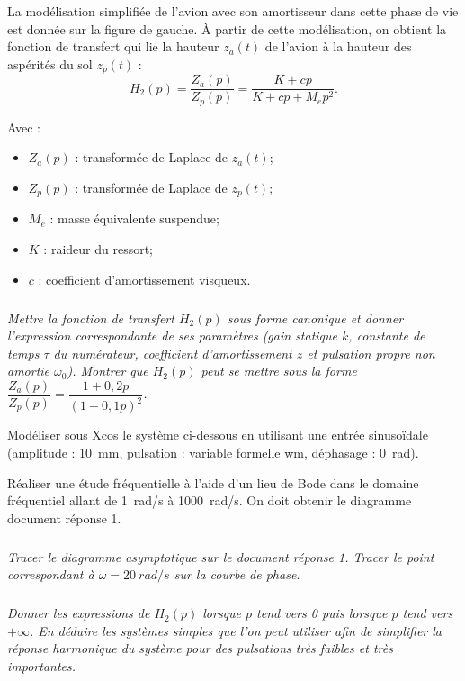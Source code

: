 \documentclass[10pt,fleqn]{article} %
\begin{document}
\begin{multicols}{2}
La modélisation simplifiée de l'avion avec son
amortisseur dans cette phase de vie est
donnée sur la figure de gauche. À partir de
cette modélisation, on obtient la fonction de
transfert qui lie la hauteur $z_a(t)$ de l'avion à la
hauteur des aspérités du sol $z_p(t)$ :
$$
H_2(p)=\dfrac{Z_a(p)}{Z_p(p)}=\dfrac{K+cp}{K+cp+M_e p^2}.
$$

Avec :
\begin{itemize}
\item $Z_a(p)$ : transformée de Laplace de $z_a(t)$;
\item $Z_p(p)$ : transformée de Laplace de $z_p(t)$;
\item $M_e$ : masse équivalente suspendue;
\item $K$ : raideur du ressort;
\item $c$ : coefficient d’amortissement visqueux.
\end{itemize}



\subparagraph{}
\textit{Mettre la fonction de transfert $H_2(p)$ sous forme canonique et donner l’expression correspondante de ses paramètres (gain statique $k$, constante de temps $\tau$ du numérateur, coefficient d’amortissement $z$ et pulsation
propre non amortie $\omega_0$). Montrer que $H_2(p)$ peut se mettre sous la forme $\dfrac{Z_a(p)}{Z_p(p)}=\dfrac{1+0,2p}{\left(1+0,1p\right)^2}$.}
\ifprof
\begin{corrige}
\end{corrige}
\else
\fi

Modéliser sous Xcos le système ci-dessous en
utilisant une entrée sinusoïdale (amplitude : \SI{10}{mm}, pulsation : variable formelle wm,
déphasage : \SI{0}{rad}).

Réaliser une étude fréquentielle à l’aide d’un lieu de Bode dans le domaine fréquentiel allant de \SI{1}{rad/s} à \SI{1000}{rad/s}. On doit obtenir le diagramme document réponse 1.

\subparagraph{}
\textit{Tracer le diagramme asymptotique sur le document réponse 1. Tracer le point correspondant à $\omega=\SI{20}{rad/s}$ sur la courbe de phase.}
\ifprof
\begin{corrige}
\end{corrige}
\else
\fi


\subparagraph{}
\textit{Donner les expressions de $H_2(p)$ lorsque $p$ tend vers 0 puis lorsque $p$
tend vers $+\infty$. En déduire les systèmes simples que l’on peut utiliser afin de simplifier la réponse harmonique du système pour des pulsations très faibles et très importantes.}
\ifprof
\begin{corrige}
\end{corrige}
\else
\fi


\end{multicols}
\end{document}
